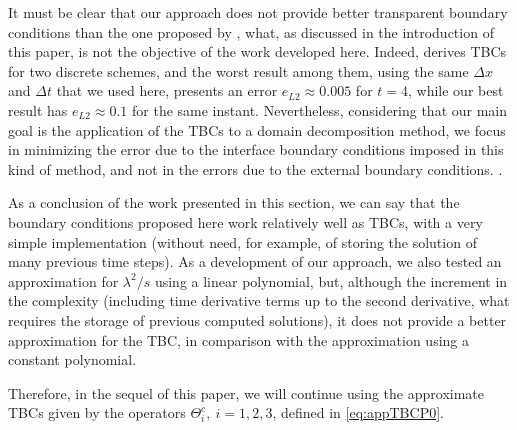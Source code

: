 \indent It must be clear that our approach does not provide better transparent boundary conditions than the one proposed by \cite{besse2015}, what, as discussed in the introduction of this paper, is not the objective of the work developed here. Indeed, \cite{besse2015} derives TBCs for two discrete schemes, and the worst result among them, using the same $\Delta x $ and $\Delta t$ that we used here, presents an error $e_{L2} \approx 0.005$ for $t = 4$, while our best result has $e_{L2} \approx 0.1$ for the same instant. Nevertheless, considering that our main goal is the application of the TBCs to a domain decomposition method, we focus in minimizing the error due to the interface boundary conditions imposed in this kind of method, and not in the errors due to the external boundary conditions. .

\indent As a conclusion of the work presented in this section, we can say that the boundary conditions proposed here work relatively well as TBCs, with a very simple implementation (without need, for example, of storing the solution of many previous time steps). As a development of our approach, we also tested an approximation for $\lambda^2/s$ using a linear polynomial, but, although the increment in the complexity (including time derivative terms up to the second derivative, what requires the storage of previous computed solutions), it does not provide a better approximation for the TBC, in comparison with the approximation using a constant polynomial.

\indent Therefore, in the sequel of this paper, we will continue using the approximate TBCs given by the operators $\Theta_i^{c}, \ i=1,2,3$, defined in \eqref{eq:appTBCP0}.